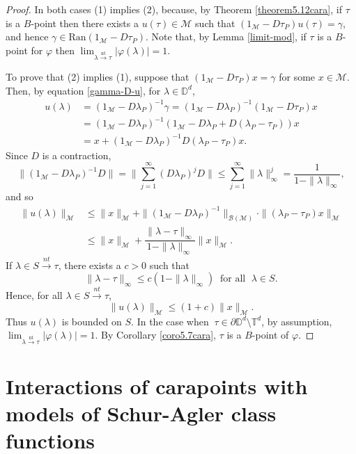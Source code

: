 \documentclass[11pt, reqno]{amsart}
\newcommand\1{\boldsymbol {1}}
\newcommand{\T}{\mathbb{T}}
\newcommand{\D}{\mathbb{D}}
\newcommand{\nt}{\stackrel{\mathrm {nt}}{\to}}
\newcommand\la{\lambda}
\numberwithin{equation}{section}
\begin{document}
\begin{proof}
 In both cases (1) implies (2), because, by Theorem \ref{theorem5.12cara},  if $\tau$ is a $B$-point then there exists
 a $u({\tau}) \in \mathcal{M}$ such that $(1_{\mathcal{M}}-D\tau_{P})u(\tau)=\gamma$, and hence $\gamma\in\mathrm{Ran}(1_{\mathcal{M}}-D\tau_{P})$.
Note that,
by Lemma \ref{limit-mod}, if $\tau$ is a  $B$-point for $\varphi$
 then $ \lim_{\la \nt \tau} |\varphi(\lambda)| =1$.

To prove that (2) implies (1), suppose that $(1_{\mathcal{M}}-D\tau_{P})x=\gamma$ for some $x\in\mathcal{M}$. 
 Then, by equation \eqref{gamma-D-u}, for $\lambda\in\mathbb{D}^{d}$, 
\begin{align*}
u(\lambda)&=(1_{\mathcal{M}}-D\lambda_{P})^{-1}\gamma=(1_{\mathcal{M}}-D\lambda_{P})^{-1}(1_{\mathcal{M}}-D\tau_{P})x\\
    &=(1_{\mathcal{M}}-D\lambda_{P})^{-1}(1_{\mathcal{M}}-D\lambda_{P}+D(\lambda_{P}-\tau_{P}))x\\
    &=x+(1_{\mathcal{M}}-D\lambda_{P})^{-1}D(\lambda_{P}-\tau_{P})x.
\end{align*}
Since $D$ is a contraction, 
$$\|(1_{\mathcal{M}}-D\lambda_{P})^{-1}D\|=\bigg\| \sum_{j=1}^{\infty}(D\lambda_{P})^{j}D\bigg\|\leq \sum_{j=1}^{\infty}\|\lambda\|_{\infty}^{j}=\dfrac{1}{1-\|\lambda\|_{\infty}},$$
and so
\begin{align*}
\|u(\lambda)\|_{\mathcal{M}}&\leq \|x\|_{\mathcal{M}}+\|(1_{\mathcal{M}}-D\lambda_{P})^{-1}\|_{\mathcal{B(M)}}\cdot \|(\lambda_{P}-\tau_{P})x\|_{\mathcal{M}}\\
&\leq \|x\|_{\mathcal{M}}+\dfrac{\|\lambda-\tau\|_{\infty}}{1-\|\lambda\|_{\infty}}\|x\|_{\mathcal{M}}.
\end{align*}
If   $\lambda\in S{\overset{nt}\rightarrow}\tau$,
 there exists a $c>0$ such that
$$\|\lambda - \tau\|_{\infty}\leq c(1-\|\lambda\|_{\infty}) \; \; \text{for all } \; \lambda \in S.$$
Hence, for all $\lambda\in S{\overset{nt}\rightarrow}\tau$, 
$$\|u(\lambda)\|_{\mathcal{M}}\leq (1+c)\|x\|_{\mathcal{M}}.$$
Thus $u(\lambda)$ is bounded on $S$.
In the case when  $ \ \tau \in \partial \D^d \setminus\T^d$,   by assumption, 
 $ \lim_{\la \nt \tau} |\varphi(\lambda)| =1$.  
By Corollary \ref{coro5.7cara}, $\tau$ is a $B$-point of $\varphi$.\end{proof}



\section{Interactions of  carapoints with  models of Schur-Agler class functions} \label{interaction}
\end{document}
